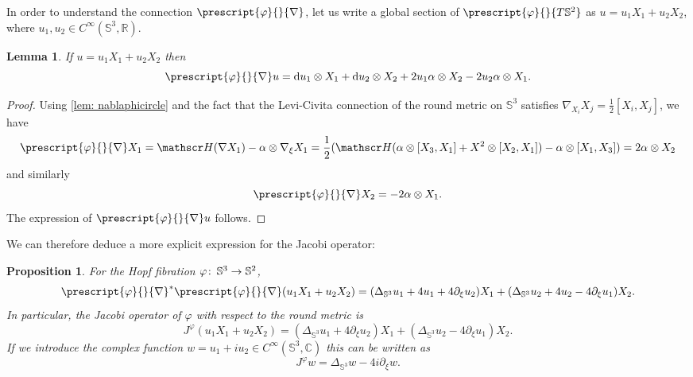 \documentclass{article}
\numberwithin{equation}{section}        %
\theoremstyle{bfnote}
\newtheorem{prop}[thm]{Proposition}         %
\newtheorem{lem}[thm]{Lemma}                %
\theoremstyle{definition}
\theoremstyle{bfremark}
\newcommand{\col}{\colon \thinspace}        %
\newcommand{\R}{\mathbb{R}}                 %
\newcommand{\C}{\mathbb{C}}                 %
\newcommand{\Sp}{\mathbb{S}}                %
\newcommand{\diff}{\mathrm{d}}                      %
\begin{document}
In order to understand the connection $\prescript{\varphi}{}{\nabla}$, let us write a global section of $\prescript{\varphi}{}{T\Sp^2}$ as $u = u_1 X_1 + u_2 X_2$, where $u_1,u_2 \in C^\infty(\Sp^3,\R)$.

\begin{lem}     \label{lem: Connection of Hopf fibration}
    If $u = u_1 X_1 + u_2 X_2$ then
    \begin{equation*}
        \prescript{\varphi}{}{\nabla} u = \diff u_1 \otimes X_1 + \diff u_2 \otimes X_2 + 2 u_1 \alpha \otimes X_2 - 2u_2 \alpha \otimes X_1 .
    \end{equation*}
\end{lem}

\begin{proof}
    Using \cref{lem: nablaphicircle} and the fact that the Levi-Civita connection of the round metric on $\Sp^3$ satisfies $\nabla_{X_i} X_j = \frac{1}{2} [X_i,X_j]$, we have
    \begin{equation*}
        \prescript{\varphi}{}{\nabla} X_1 = \mathscr H(\nabla X_1) - \alpha \otimes \nabla_\xi X_1 = \frac{1}{2}(\mathscr H(\alpha \otimes [X_3,X_1] + X^2 \otimes [X_2,X_1]) - \alpha \otimes [X_1,X_3]) = 2 \alpha \otimes X_2
    \end{equation*}
    and similarly
    \begin{equation*}
        \prescript{\varphi}{}{\nabla} X_2 = -2 \alpha \otimes X_1 .
    \end{equation*}
    The expression of $\prescript{\varphi}{}{\nabla} u$ follows.
\end{proof}

We can therefore deduce a more explicit expression for the Jacobi operator:

\begin{prop}    \label{prop: Jacobi Operator Hopf fibration}
    For the Hopf fibration $\varphi \col \Sp^3 \rightarrow \Sp^2$,
    \begin{equation*}
        \prescript{\varphi}{}{\nabla}^*\prescript{\varphi}{}{\nabla} (u_1 X_1 + u_2 X_2) = (\Delta_{\mathbb{S}^3} u_1 + 4 u_1 + 4 \partial_\xi u_2) X_1 + (\Delta_{\mathbb{S}^3} u_2 + 4u_2 - 4 \partial_\xi u_1) X_2 .
    \end{equation*}
    In particular, the Jacobi operator of $\varphi$ with respect to the round metric is
    \begin{equation*}
        J^\varphi (u_1 X_1 + u_2 X_2) = (\Delta_{\mathbb{S}^3} u_1 + 4 \partial_\xi u_2) X_1 + (\Delta_{\mathbb{S}^3} u_2 - 4 \partial_\xi u_1) X_2 .
    \end{equation*}
    If we introduce the complex function $w = u_1+iu_2 \in C^\infty(\Sp^3,\C)$ this can be written as
    \begin{equation*}
        J^\varphi w = \Delta_{\mathbb{S}^3} w - 4 i \partial_\xi w .
    \end{equation*}
\end{prop}
\end{document}
